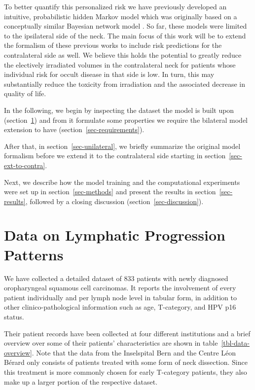 \documentclass[
  sn-mathphys-num,
]{sn-jnl}
\begin{document}
To better quantify this personalized risk we have previously developed
an intuitive, probabilistic hidden Markov model
\citep{ludwig_hidden_2021, ludwig_modelling_2023} which was originally
based on a conceptually similar Bayesian network model
\citep{pouymayou_bayesian_2019}. So far, these models were limited to
the ipsilateral side of the neck. The main focus of this work will be to
extend the formalism of these previous works to include risk predictions
for the contralateral side as well. We believe this holds the potential
to greatly reduce the electively irradiated volumes in the contralateral
neck for patients whose individual risk for occult disease in that side
is low. In turn, this may substantially reduce the toxicity from
irradiation and the associated decrease in quality of life.

In the following, we begin by inspecting the dataset the model is built
upon (section~\ref{sec-data}) and from it formulate some properties we
require the bilateral model extension to have
(section~\ref{sec-requirements}).

After that, in section~\ref{sec-unilateral}, we briefly summarize the
original model formalism before we extend it to the contralateral side
starting in section~\ref{sec-ext-to-contra}.

Next, we describe how the model training and the computational
experiments were set up in section~\ref{sec-methods} and present the
results in section~\ref{sec-results}, followed by a closing discussion
(section~\ref{sec-discussion}).

\section{Data on Lymphatic Progression Patterns}\label{sec-data}

We have collected a detailed dataset of 833 patients with newly
diagnosed oropharyngeal squamous cell carcinomas. It reports the
involvement of every patient individually and per lymph node level in
tabular form, in addition to other clinico-pathological information such
as age, T-category, and HPV p16 status.

Their patient records have been collected at four different institutions
and a brief overview over some of their patients' characteristics are
shown in table~\ref{tbl-data-overview}. Note that the data from the
Inselspital Bern and the Centre Léon Bérard only consists of patients
treated with some form of neck dissection. Since this treatment is more
commonly chosen for early T-category patients, they also make up a
larger portion of the respective dataset.
\end{document}
